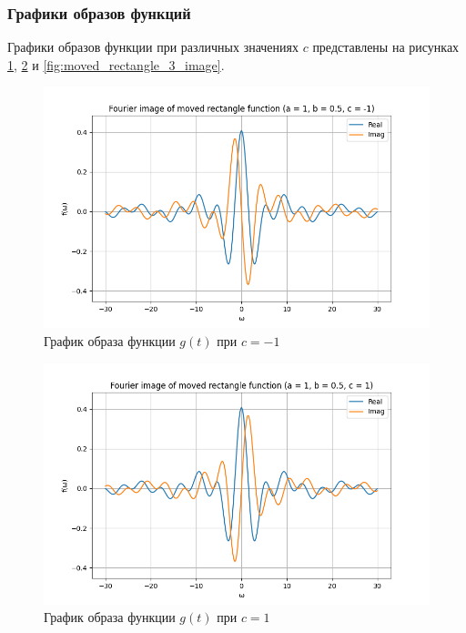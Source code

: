 \subsubsection{Графики образов функций}
Графики образов функции при различных значениях $c$ представлены на рисунках \ref{fig:moved_rectangle_1_image}, \ref{fig:moved_rectangle_2_image} и \ref{fig:moved_rectangle_3_image}.

\begin{figure}[ht!]
    \centering
    \includegraphics[width=\textwidth]{media/moved_rectangle_1_image.png}
    \caption{График образа функции $g(t)$ при $c = -1$}
    \label{fig:moved_rectangle_1_image}
\end{figure}

\begin{figure}[ht!]
    \centering
    \includegraphics[width=\textwidth]{media/moved_rectangle_2_image.png}
    \caption{График образа функции $g(t)$ при $c = 1$}
    \label{fig:moved_rectangle_2_image}
\end{figure}

